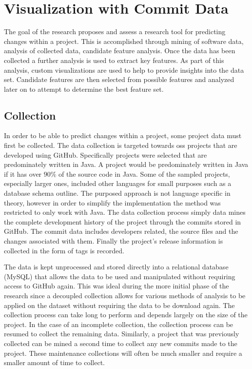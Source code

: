 \chapter{Visualization with Commit Data}
\label{chap:visualization}

The goal of the research proposes and assess a research tool for predicting changes within a project. This is accomplished through mining of software data, analysis of collected data, candidate feature analysis. Once the data has been collected a further analysis is used to extract key features. As part of this analysis, custom visualizations are used to help to provide insights into the data set. Candidate features are then selected from possible features and analyzed later on to attempt to determine the best feature set.


\section{Collection}
\label{sec:collection}

In order to be able to predict changes within a project, some project data must first be collected. The data collection is targeted towards \gls{oss} projects that are developed using GitHub. Specifically projects were selected that are predominately written in Java. A project would be predominately written in Java if it has over $90\%$ of the source code in Java. Some of the sampled projects, especially larger ones, included other languages for small purposes such as a database schema outline. The purposed approach is not language specific in theory, however in order to simplify the implementation the method was restricted to only work with Java. The data collection process simply data mines the complete development history of the project through the commits stored in GitHub. The commit data includes developers related, the source files and the changes associated with them. Finally the project's release information is collected in the form of tags is recorded.

The data is kept unprocessed and stored directly into a relational database (MySQL) that allows the data to be used and manipulated without requiring access to GitHub again.  This was ideal during the more initial phase of the research since a decoupled collection allows for various methods of analysis to be applied on the dataset without requiring the data to be download again. The collection process can take long to perform and depends largely on the size of the project. In the case of an incomplete collection, the collection process can be resumed to collect the remaining data. Similarly, a project that was previously collected can be mined a second time to collect any new commits made to the project. These maintenance collections will often be much smaller and require a smaller amount of time to collect.

